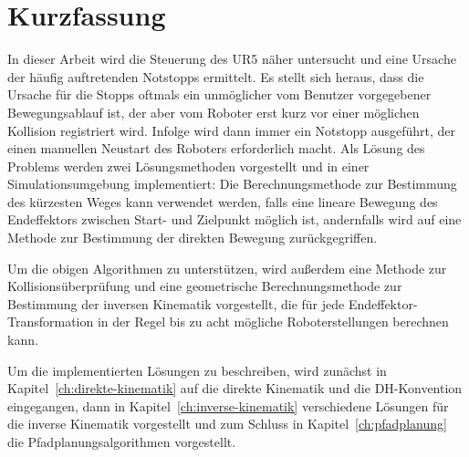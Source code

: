 \chapter*{Kurzfassung}


In dieser Arbeit wird die Steuerung des UR5 näher untersucht und eine Ursache der häufig auftretenden Notstopps ermittelt.
Es stellt sich heraus, dass die Ursache für die Stopps oftmals ein unmöglicher vom Benutzer vorgegebener Bewegungsablauf ist, der aber vom Roboter erst kurz vor einer möglichen Kollision registriert wird.
Infolge wird dann immer ein Notstopp ausgeführt, der einen manuellen Neustart des Roboters erforderlich macht.
Als Lösung des Problems werden zwei Lösungsmethoden vorgestellt und in einer Simulationsumgebung implementiert:
Die Berechnungsmethode zur Bestimmung des kürzesten Weges kann verwendet werden, falls eine lineare Bewegung des Endeffektors zwischen Start- und Zielpunkt möglich ist,
andernfalls wird auf eine Methode zur Bestimmung der direkten Bewegung zurückgegriffen.

Um die obigen Algorithmen zu unterstützen, wird außerdem eine Methode zur Kollisionsüberprüfung und eine geometrische Berechnungsmethode zur Bestimmung der inversen Kinematik vorgestellt,
die für jede Endeffektor-Transformation in der Regel bis zu acht mögliche Roboterstellungen berechnen kann.

Um die implementierten Lösungen zu beschreiben, wird zunächst in Kapitel~\ref{ch:direkte-kinematik} auf die direkte Kinematik und die DH-Konvention eingegangen, dann in Kapitel~\ref{ch:inverse-kinematik} verschiedene Lösungen für die inverse Kinematik vorgestellt und zum Schluss in Kapitel~\ref{ch:pfadplanung} die Pfadplanungsalgorithmen vorgestellt.